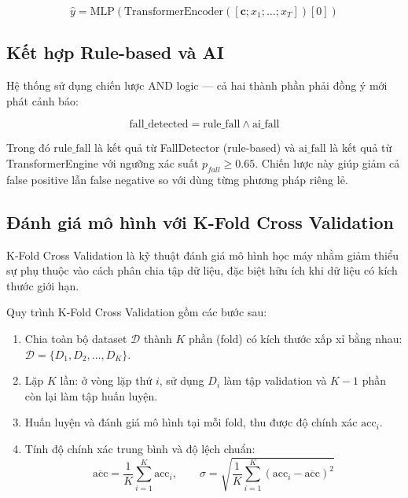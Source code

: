 \begin{equation}
    \hat{y} = \text{MLP}(\text{TransformerEncoder}([\mathbf{c}; x_1; \ldots; x_T])[0])
\end{equation}

\subsection{Kết hợp Rule-based và AI}

Hệ thống sử dụng chiến lược AND logic — cả hai thành phần phải đồng ý mới phát cảnh báo:

\begin{equation}
    \text{fall\_detected} = \text{rule\_fall} \wedge \text{ai\_fall}
\end{equation}

Trong đó $\text{rule\_fall}$ là kết quả từ FallDetector (rule-based) và $\text{ai\_fall}$ là kết quả từ TransformerEngine với ngưỡng xác suất $p_{fall} \geq 0.65$. Chiến lược này giúp giảm cả false positive lẫn false negative so với dùng từng phương pháp riêng lẻ.

\subsection{Đánh giá mô hình với K-Fold Cross Validation}

K-Fold Cross Validation là kỹ thuật đánh giá mô hình học máy nhằm giảm thiểu sự phụ thuộc vào cách phân chia tập dữ liệu, đặc biệt hữu ích khi dữ liệu có kích thước giới hạn.

Quy trình K-Fold Cross Validation gồm các bước sau:

\begin{enumerate}
    \item Chia toàn bộ dataset $\mathcal{D}$ thành $K$ phần (fold) có kích thước xấp xỉ bằng nhau: $\mathcal{D} = \{D_1, D_2, \ldots, D_K\}$.
    \item Lặp $K$ lần: ở vòng lặp thứ $i$, sử dụng $D_i$ làm tập validation và $K-1$ phần còn lại làm tập huấn luyện.
    \item Huấn luyện và đánh giá mô hình tại mỗi fold, thu được độ chính xác $\text{acc}_i$.
    \item Tính độ chính xác trung bình và độ lệch chuẩn:
    \begin{equation}
        \overline{\text{acc}} = \frac{1}{K}\sum_{i=1}^{K}\text{acc}_i, \qquad
        \sigma = \sqrt{\frac{1}{K}\sum_{i=1}^{K}(\text{acc}_i - \overline{\text{acc}})^2}
    \end{equation}
\end{enumerate}

